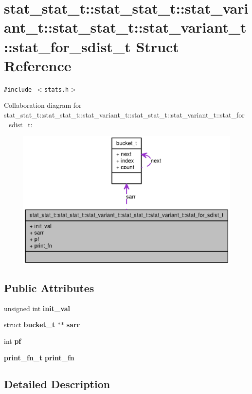 \section{stat\_\-stat\_\-t::stat\_\-stat\_\-t::stat\_\-variant\_\-t::stat\_\-stat\_\-t::stat\_\-variant\_\-t::stat\_\-for\_\-sdist\_\-t Struct Reference}
\label{structstat__stat__t_1_1stat__variant__t_1_1stat__for__sdist__t}
{\tt \#include $<$stats.h$>$}

Collaboration diagram for stat\_\-stat\_\-t::stat\_\-stat\_\-t::stat\_\-variant\_\-t::stat\_\-stat\_\-t::stat\_\-variant\_\-t::stat\_\-for\_\-sdist\_\-t:\nopagebreak
\begin{figure}[H]
\begin{center}
\leavevmode
\includegraphics[width=400pt]{structstat__stat__t_1_1stat__variant__t_1_1stat__for__sdist__t__coll__graph}
\end{center}
\end{figure}
\subsection*{Public Attributes}
\begin{CompactItemize}
\item 
unsigned int {\bf init\_\-val}
\item 
struct {\bf bucket\_\-t} $\ast$$\ast$ {\bf sarr}
\item 
int {\bf pf}
\item 
{\bf print\_\-fn\_\-t} {\bf print\_\-fn}
\end{CompactItemize}


\subsection{Detailed Description}


